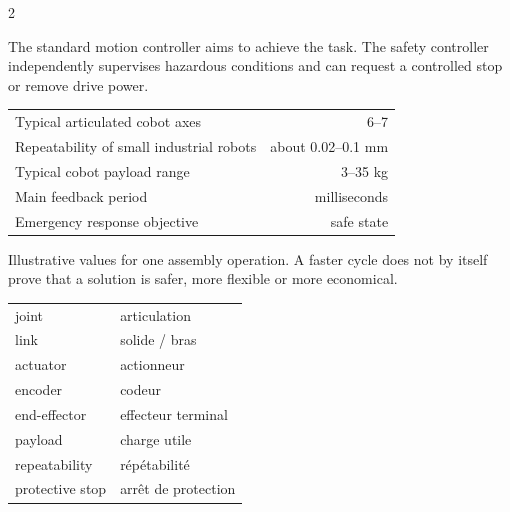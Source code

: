 \begin{multicols}{2}
\begin{engineeringfocus}
The standard motion controller aims to achieve the task. The safety controller independently supervises hazardous conditions and can request a controlled stop or remove drive power.
\end{engineeringfocus}

\begin{keyfigures}
\begin{tabularx}{\linewidth}{@{}Xr@{}}
Typical articulated cobot axes & 6--7\\
Repeatability of small industrial robots & about 0.02--0.1 mm\\
Typical cobot payload range & 3--35 kg\\
Main feedback period & milliseconds\\
Emergency response objective & safe state
\end{tabularx}
\end{keyfigures}

\begin{tcolorbox}[title=\sffamily\bfseries Assembly cycle comparison,colback=white,colframe=ECBlue]
\begin{center}
\end{center}
\footnotesize Illustrative values for one assembly operation. A faster cycle does not by itself prove that a solution is safer, more flexible or more economical.
\end{tcolorbox}

\begin{vocabulary}
\begin{tabularx}{\linewidth}{@{}lX@{}}
joint & articulation\\
link & solide / bras\\
actuator & actionneur\\
encoder & codeur\\
end-effector & effecteur terminal\\
payload & charge utile\\
repeatability & répétabilité\\
protective stop & arrêt de protection
\end{tabularx}
\end{vocabulary}


\end{multicols}
